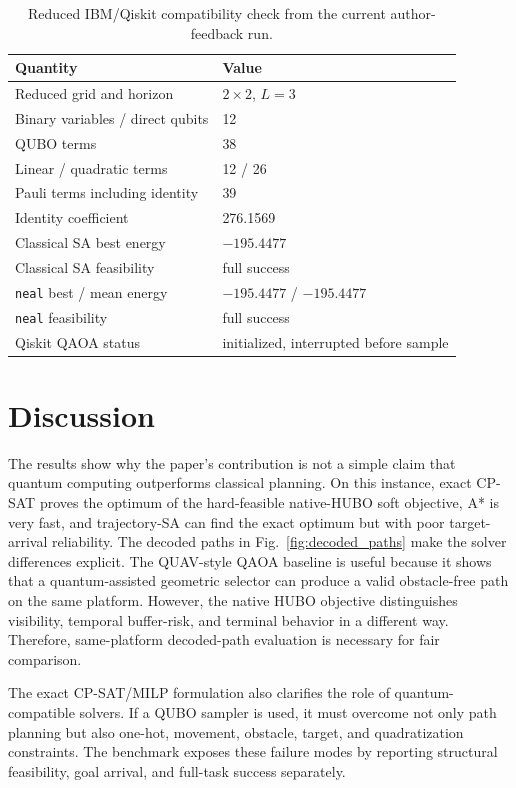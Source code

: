 \documentclass[10pt,conference]{IEEEtran}
\begin{document}
\begin{table}[t]
\centering
\caption{Reduced IBM/Qiskit compatibility check from the current author-feedback run.}
\label{tab:qiskit_reduced_status}
\scriptsize
\begin{tabular}{@{}ll@{}}
\toprule
Quantity & Value\\
\midrule
Reduced grid and horizon & $2\times2$, $L=3$\\
Binary variables / direct qubits & 12\\
QUBO terms & 38\\
Linear / quadratic terms & 12 / 26\\
Pauli terms including identity & 39\\
Identity coefficient & 276.1569\\
Classical SA best energy & $-195.4477$\\
Classical SA feasibility & full success\\
\texttt{neal} best / mean energy & $-195.4477$ / $-195.4477$\\
\texttt{neal} feasibility & full success\\
Qiskit QAOA status & initialized, interrupted before sample\\
\bottomrule
\end{tabular}
\end{table}


\FloatBarrier
\section{Discussion}
The results show why the paper's contribution is not a simple claim that quantum computing outperforms classical planning. On this instance, exact CP-SAT proves the optimum of the hard-feasible native-HUBO soft objective, A* is very fast, and trajectory-SA can find the exact optimum but with poor target-arrival reliability. The decoded paths in Fig.~\ref{fig:decoded_paths} make the solver differences explicit. The QUAV-style QAOA baseline is useful because it shows that a quantum-assisted geometric selector can produce a valid obstacle-free path on the same platform. However, the native HUBO objective distinguishes visibility, temporal buffer-risk, and terminal behavior in a different way. Therefore, same-platform decoded-path evaluation is necessary for fair comparison.

The exact CP-SAT/MILP formulation also clarifies the role of quantum-compatible solvers. If a QUBO sampler is used, it must overcome not only path planning but also one-hot, movement, obstacle, target, and quadratization constraints. The benchmark exposes these failure modes by reporting structural feasibility, goal arrival, and full-task success separately.
\end{document}
